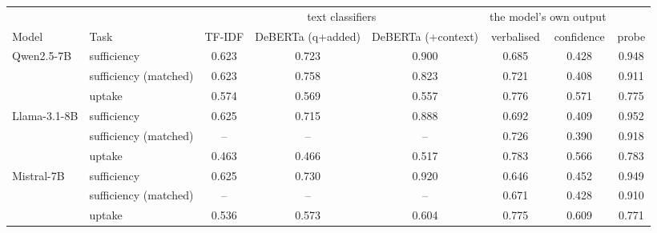 \begin{tabular}{llcccccc}
\toprule
& & \multicolumn{3}{c}{text classifiers} & \multicolumn{2}{c}{the model's own output} & \\
\cmidrule(lr){3-5}\cmidrule(lr){6-7}
Model & Task & TF-IDF & DeBERTa (q+added) & DeBERTa (+context) & verbalised & confidence & probe \\
\midrule
Qwen2.5-7B & sufficiency & 0.623 & 0.723 & 0.900 & 0.685 & 0.428 & 0.948 \\
 & sufficiency (matched) & 0.623 & 0.758 & 0.823 & 0.721 & 0.408 & 0.911 \\
 & uptake & 0.574 & 0.569 & 0.557 & 0.776 & 0.571 & 0.775 \\
\midrule
Llama-3.1-8B & sufficiency & 0.625 & 0.715 & 0.888 & 0.692 & 0.409 & 0.952 \\
 & sufficiency (matched) & -- & -- & -- & 0.726 & 0.390 & 0.918 \\
 & uptake & 0.463 & 0.466 & 0.517 & 0.783 & 0.566 & 0.783 \\
\midrule
Mistral-7B & sufficiency & 0.625 & 0.730 & 0.920 & 0.646 & 0.452 & 0.949 \\
 & sufficiency (matched) & -- & -- & -- & 0.671 & 0.428 & 0.910 \\
 & uptake & 0.536 & 0.573 & 0.604 & 0.775 & 0.609 & 0.771 \\
\bottomrule
\end{tabular}